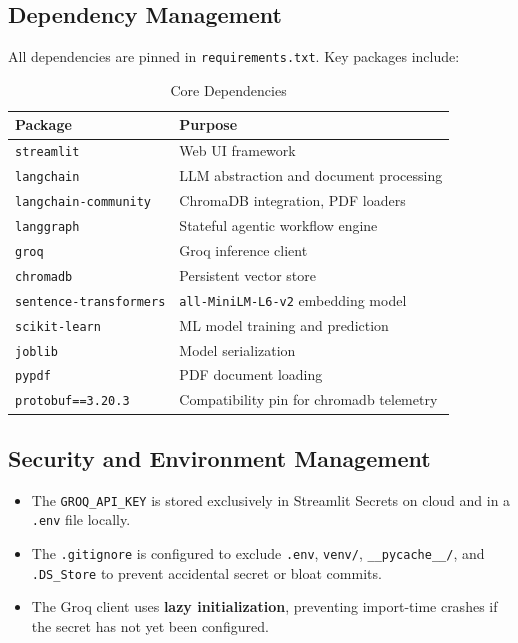 \documentclass[12pt,a4paper]{article}
\newcommand{\code}[1]{\texttt{\small\color{blue!70!black}#1}}
\begin{document}
\subsection{Dependency Management}

All dependencies are pinned in \code{requirements.txt}. Key packages include:

\begin{table}[H]
\centering
\caption{Core Dependencies}
\begin{tabular}{ll}
\toprule
\textbf{Package} & \textbf{Purpose} \\
\midrule
\code{streamlit}            & Web UI framework \\
\code{langchain}            & LLM abstraction and document processing \\
\code{langchain-community}  & ChromaDB integration, PDF loaders \\
\code{langgraph}            & Stateful agentic workflow engine \\
\code{groq}                 & Groq inference client \\
\code{chromadb}             & Persistent vector store \\
\code{sentence-transformers}& \code{all-MiniLM-L6-v2} embedding model \\
\code{scikit-learn}         & ML model training and prediction \\
\code{joblib}               & Model serialization \\
\code{pypdf}                & PDF document loading \\
\code{protobuf==3.20.3}     & Compatibility pin for chromadb telemetry \\
\bottomrule
\end{tabular}
\end{table}

\subsection{Security and Environment Management}

\begin{itemize}
    \item The \code{GROQ\_API\_KEY} is stored exclusively in Streamlit Secrets on cloud and in a \code{.env} file locally.
    \item The \code{.gitignore} is configured to exclude \code{.env}, \code{venv/}, \code{\_\_pycache\_\_/}, and \code{.DS\_Store} to prevent accidental secret or bloat commits.
    \item The Groq client uses \textbf{lazy initialization}, preventing import-time crashes if the secret has not yet been configured.
\end{itemize}
\end{document}
